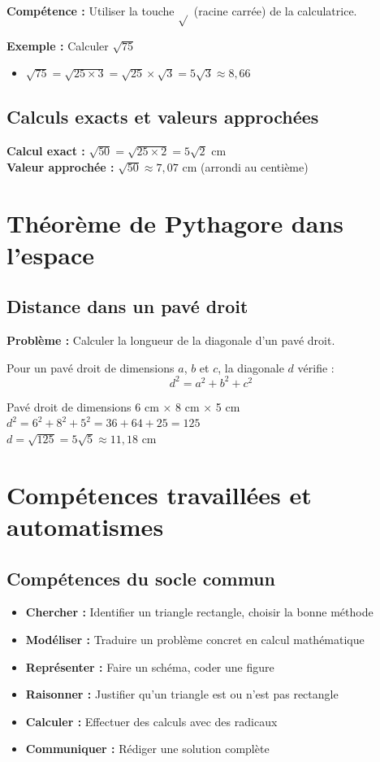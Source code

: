 \textbf{Compétence :} Utiliser la touche $\sqrt{}$ (racine carrée) de la calculatrice.

\textbf{Exemple :} Calculer $\sqrt{75}$
\begin{itemize}
    \item $\sqrt{75} = \sqrt{25 \times 3} = \sqrt{25} \times \sqrt{3} = 5\sqrt{3} \approx 8,66$
\end{itemize}

\subsection{Calculs exacts et valeurs approchées}

\textbf{Calcul exact :} $\sqrt{50} = \sqrt{25 \times 2} = 5\sqrt{2}$ cm\\
\textbf{Valeur approchée :} $\sqrt{50} \approx 7,07$ cm (arrondi au centième)

\section{Théorème de Pythagore dans l'espace}

\subsection{Distance dans un pavé droit}

\textbf{Problème :} Calculer la longueur de la diagonale d'un pavé droit.

Pour un pavé droit de dimensions $a$, $b$ et $c$, la diagonale $d$ vérifie :
\[d^2 = a^2 + b^2 + c^2\]

\begin{exemple}
Pavé droit de dimensions 6 cm × 8 cm × 5 cm\\
$d^2 = 6^2 + 8^2 + 5^2 = 36 + 64 + 25 = 125$\\
$d = \sqrt{125} = 5\sqrt{5} \approx 11,18$ cm
\end{exemple}

\section{Compétences travaillées et automatismes}

\subsection{Compétences du socle commun}

\begin{itemize}
    \item \textbf{Chercher :} Identifier un triangle rectangle, choisir la bonne méthode
    \item \textbf{Modéliser :} Traduire un problème concret en calcul mathématique
    \item \textbf{Représenter :} Faire un schéma, coder une figure
    \item \textbf{Raisonner :} Justifier qu'un triangle est ou n'est pas rectangle
    \item \textbf{Calculer :} Effectuer des calculs avec des radicaux
    \item \textbf{Communiquer :} Rédiger une solution complète
\end{itemize}

